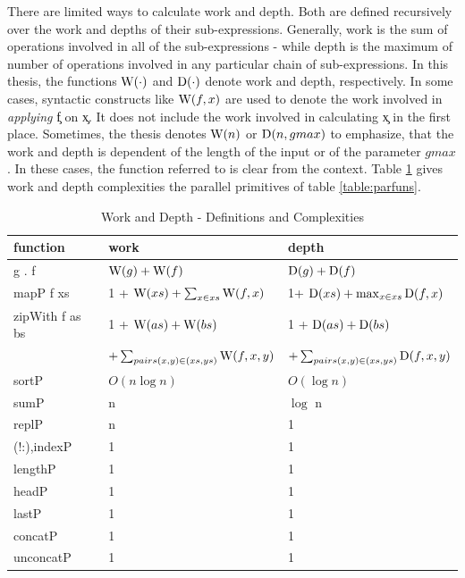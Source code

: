   There are limited ways to calculate work and depth. Both are defined
  recursively over the work and depths of their sub-expressions. Generally,
  work is the sum of operations involved in all of the sub-expressions
  - while depth is the maximum of number of operations involved in
  any particular chain of sub-expressions.
  In this thesis, the functions $\textrm{W}(\cdot)$ and $\textrm{D}(\cdot)$ denote work
  and depth, respectively. In some cases, syntactic constructs
  like $\textrm{W}(f,x)$ are used to denote the work involved in \emph{applying}
  \c{f} on \c{x}. It does not include the work involved
  in calculating \c{x} in the first place. Sometimes,
  the thesis denotes $\textrm{W}(n)$ or $\textrm{D}(n,gmax)$ to emphasize,
  that the work and depth is dependent of the length of the input
  or of the parameter $gmax$. In these cases, the function referred to
  is clear from the context.
  Table \ref{table:workdepth} gives work and depth complexities the parallel primitives
  of table \ref{table:parfuns}.
  
  \begin{table}[h]
    \caption{Work and Depth - Definitions and Complexities}
    \label{table:workdepth}
    \begin{center}
    \begin{tabular}{lll}
      \toprule
      function & work & depth \\
      \midrule
      g . f & $\textrm{W}(g) + \textrm{W}(f)$ & $\textrm{D}(g) + \textrm{D}(f)$ \\
      mapP f xs & 1 + $\textrm{W}(xs) + \sum_{x \in xs}\textrm{W}(f,x)$ & 1+ $\textrm{D}(xs) + \max_{x \in xs}\textrm{D}(f,x)$ \\
      zipWith f as bs & 1 + $\textrm{W}(as) + \textrm{W}(bs)$ & 1 + $\textrm{D}(as) + \textrm{D}(bs)$ \\
        & $+ \sum_{pairs (x,y) \in (xs,ys)}\textrm{W}(f,x,y)$ & $ + \sum_{pairs (x,y) \in (xs,ys)}\textrm{D}(f,x,y)$ \\
      sortP & $O(n \log n)$ & $O(\log n)$ \\
      sumP & n & $\log$ n \\
      replP &  n & 1 \\
      (!:),indexP & 1 & 1 \\
      lengthP & 1 & 1 \\
      headP & 1 & 1 \\
      lastP & 1 & 1 \\
      concatP & 1 & 1 \\
      unconcatP & 1 & 1 \\
    \end{tabular}
    \end{center}
  \end{table}
  
